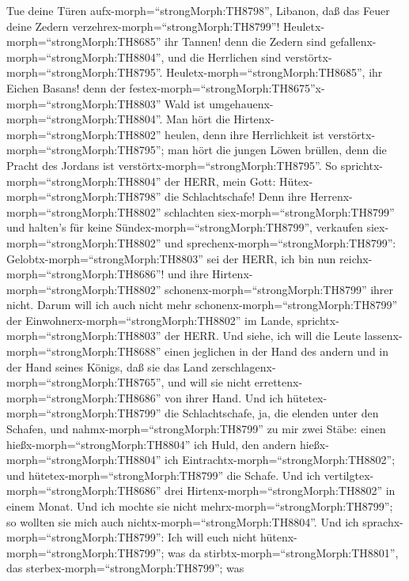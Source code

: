  Tue deine Türen aufx-morph=``strongMorph:TH8798'', Libanon,
daß das Feuer deine Zedern verzehrex-morph=``strongMorph:TH8799''!
 Heuletx-morph=``strongMorph:TH8685'' ihr Tannen! denn die
Zedern sind gefallenx-morph=``strongMorph:TH8804'', und die Herrlichen
sind verstörtx-morph=``strongMorph:TH8795''.
Heuletx-morph=``strongMorph:TH8685'', ihr Eichen Basans! denn der
festex-morph=``strongMorph:TH8675''x-morph=``strongMorph:TH8803'' Wald
ist umgehauenx-morph=``strongMorph:TH8804''.  Man hört die
Hirtenx-morph=``strongMorph:TH8802'' heulen, denn ihre Herrlichkeit ist
verstörtx-morph=``strongMorph:TH8795''; man hört die jungen Löwen
brüllen, denn die Pracht des Jordans ist
verstörtx-morph=``strongMorph:TH8795''.  So
sprichtx-morph=``strongMorph:TH8804'' der HERR, mein Gott:
Hütex-morph=``strongMorph:TH8798'' die Schlachtschafe!  Denn
ihre Herrenx-morph=``strongMorph:TH8802'' schlachten
siex-morph=``strongMorph:TH8799'' und halten's für keine
Sündex-morph=``strongMorph:TH8799'', verkaufen
siex-morph=``strongMorph:TH8802'' und
sprechenx-morph=``strongMorph:TH8799'':
Gelobtx-morph=``strongMorph:TH8803'' sei der HERR, ich bin nun
reichx-morph=``strongMorph:TH8686''! und ihre
Hirtenx-morph=``strongMorph:TH8802''
schonenx-morph=``strongMorph:TH8799'' ihrer nicht.  Darum
will ich auch nicht mehr schonenx-morph=``strongMorph:TH8799'' der
Einwohnerx-morph=``strongMorph:TH8802'' im Lande,
sprichtx-morph=``strongMorph:TH8803'' der HERR. Und siehe, ich will die
Leute lassenx-morph=``strongMorph:TH8688'' einen jeglichen in der Hand
des andern und in der Hand seines Königs, daß sie das Land
zerschlagenx-morph=``strongMorph:TH8765'', und will sie nicht
errettenx-morph=``strongMorph:TH8686'' von ihrer Hand.  Und
ich hütetex-morph=``strongMorph:TH8799'' die Schlachtschafe, ja, die
elenden unter den Schafen, und nahmx-morph=``strongMorph:TH8799'' zu mir
zwei Stäbe: einen hießx-morph=``strongMorph:TH8804'' ich Huld, den
andern hießx-morph=``strongMorph:TH8804'' ich
Eintrachtx-morph=``strongMorph:TH8802''; und
hütetex-morph=``strongMorph:TH8799'' die Schafe.  Und ich
vertilgtex-morph=``strongMorph:TH8686'' drei
Hirtenx-morph=``strongMorph:TH8802'' in einem Monat. Und ich mochte sie
nicht mehrx-morph=``strongMorph:TH8799''; so wollten sie mich auch
nichtx-morph=``strongMorph:TH8804''.  Und ich
sprachx-morph=``strongMorph:TH8799'': Ich will euch nicht
hütenx-morph=``strongMorph:TH8799''; was da
stirbtx-morph=``strongMorph:TH8801'', das
sterbex-morph=``strongMorph:TH8799''; was
